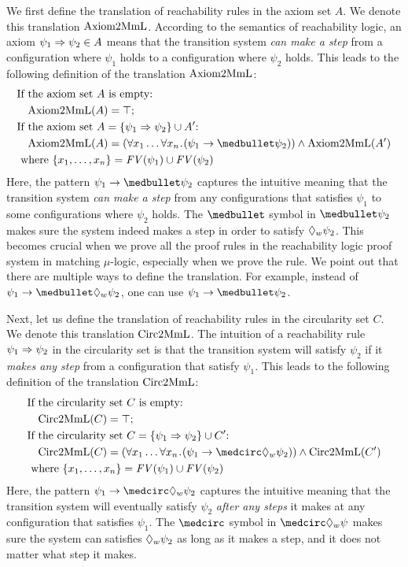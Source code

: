 \documentclass{amsart}
\begin{document}
We first define the translation of reachability rules in the axiom set $A$.
We denote this translation $\mathrm{Axiom2MmL}$.
According to the semantics of reachability logic, 
an axiom $\psi_1 \Rightarrow \psi_2 \in A$ means that
the transition system \emph{can make a step} from a configuration
where $\psi_1$ holds to a configuration where $\psi_2$ holds. 
This leads to the following definition of the translation $\mathrm{Axiom2MmL}$:
\begin{align*}
&\text{If the axiom set $A$ is empty:}\\
&\quad \transA(A) = \top; \\
&\text{If the axiom set $A = \{ \psi_1 \To \psi_2 \} \cup A'$:}\\
&\quad \transA(A) =
(\forall x_1 \dots \forall x_n \ldot (\psi_1 \imp \snext \psi_2))
\wedge \transA(A')
\\
& \text{ where $\{x_1,\dots,x_n\} = \FV(\psi_1) \cup \FV(\psi_2)$}
\end{align*}
Here, the pattern $\psi_1 \imp \snext \psi_2$ 
captures the intuitive meaning that 
the transition system \emph{can make a step} from any configurations that satisfies
$\psi_1$ to some configurations where $\psi_2$ holds. 
The $\snext$ symbol in $\snext \psi_2$ makes sure the system
indeed makes a step in order to satisfy ${\lozenge}_w \psi_2$. 
This becomes crucial when we prove all the proof rules in the reachability logic
proof system in matching $\mu$-logic, especially when we prove
the \circularity rule. 
We point out that there are multiple ways to define the translation. 
For example, instead of $\psi_1 \to \snext \eventually_w \psi_2$,
one can use $\psi_1 \to \snext \psi_2$.

Next, let us define the translation of reachability rules in the circularity set $C$.
We denote this translation $\mathrm{Circ2MmL}$. 
The intuition of a reachability rule $\psi_1 \Rightarrow \psi_2$ in the circularity set
is that the transition system will satisfy $\psi_2$ if it
\emph{makes any step} from a configuration that satisfy $\psi_1$.
This leads to the following definition of the translation $\mathrm{Circ2MmL}$:
\begin{align*}
&\text{If the circularity set $C$ is empty:}\\
&\quad \transC(C) = \top; \\
&\text{If the circularity set $C = \{ \psi_1 \To \psi_2 \} \cup C'$:}\\
&\quad \transC(C) =
(\forall x_1 \dots \forall x_n \ldot (\psi_1 \imp \wnext \eventually_w \psi_2))
\wedge \transC(C')
\\
& \text{ where $\{x_1,\dots,x_n\} = \FV(\psi_1) \cup \FV(\psi_2)$}
\end{align*}
Here, the pattern $\psi_1 \to \wnext \eventually_w \psi_2$ captures the intuitive
meaning that the transition system will eventually satisfy $\psi_2$
\emph{after any steps} it makes at any configuration that satisfies $\psi_1$. 
The $\wnext$ symbol in $\wnext \eventually_w \psi$ makes sure the system can satisfies
${\lozenge}_w \psi_2$ as long as it makes a step, and it does not matter
what step it makes. 
\end{document}
